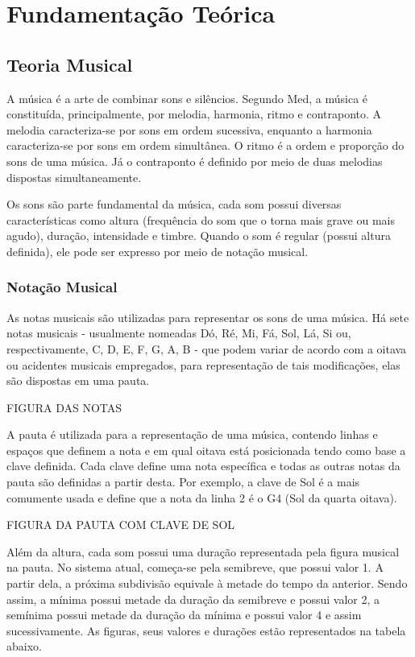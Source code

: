 \chapter[Fundamentação Teórica]{Fundamentação Teórica}

  \section[Teoria Musical]{Teoria Musical}

    A música é a arte de combinar sons e silêncios. Segundo Med, a música é constituída, principalmente, por melodia, harmonia, ritmo e contraponto. A melodia caracteriza-se por sons em ordem sucessiva, enquanto a harmonia caracteriza-se por sons em ordem simultânea. O ritmo é a ordem e proporção do sons de uma música. Já o contraponto é definido por meio de duas melodias dispostas simultaneamente.

    Os sons são parte fundamental da música, cada som possui diversas características como altura (frequência do som que o torna mais grave ou mais agudo), duração, intensidade e timbre. Quando o som é regular (possui altura definida), ele pode ser expresso por meio de notação musical.

    \subsection[Notação Musical]{Notação Musical}

      As notas musicais são utilizadas para representar os sons de uma música. Há sete notas musicais - usualmente nomeadas Dó, Ré, Mi, Fá, Sol, Lá, Si ou, respectivamente, C, D, E, F, G, A, B - que podem variar de acordo com a oitava ou acidentes musicais empregados, para representação de tais modificações, elas são dispostas em uma pauta.

      FIGURA DAS NOTAS

      A pauta é utilizada para a representação de uma música, contendo linhas e espaços que definem a nota e em qual oitava está posicionada tendo como base a clave definida. Cada clave define uma nota específica e todas as outras notas da pauta são definidas a partir desta. Por exemplo, a clave de Sol é a mais comumente usada e define que a nota da linha 2 é o G4 (Sol da quarta oitava).

      FIGURA DA PAUTA COM CLAVE DE SOL

      Além da altura, cada som possui uma duração representada pela figura musical na pauta. No sistema atual, começa-se pela semibreve, que possui valor 1. A partir dela, a próxima subdivisão equivale à metade do tempo da anterior. Sendo assim, a mínima possui metade da duração da semibreve e possui valor 2, a semínima possui metade da duração da mínima e possui valor 4 e assim sucessivamente. As figuras, seus valores e durações estão representados na tabela abaixo.


